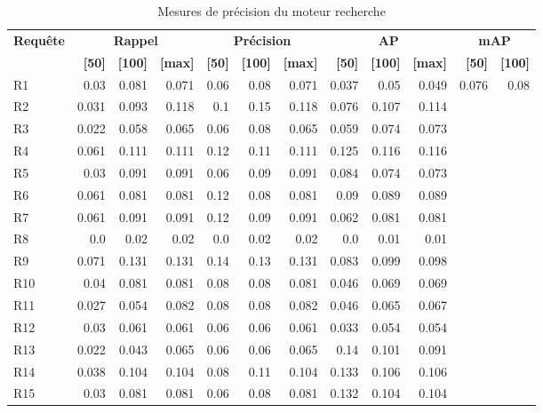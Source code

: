 \begin{table}[H]
\centering
\begin{tabular}{l|rrr|rrr|rrr|rr}
\toprule
\textbf{Requête} & \multicolumn{3}{c}{\textbf{Rappel}} & \multicolumn{3}{c}{\textbf{Précision}} & \multicolumn{3}{c}{\textbf{AP}} & \multicolumn{2}{c}{\textbf{mAP}} \\
 & \textbf{[50]} & \textbf{[100]} & \textbf{[max]} & \textbf{[50]} & \textbf{[100]} & \textbf{[max]} & \textbf{[50]} & \textbf{[100]} & \textbf{[max]} & \textbf{[50]} & \textbf{[100]} \\
\midrule
R1 & 0.03 & 0.081 & 0.071 & 0.06 & 0.08 & 0.071 & 0.037 & 0.05 & 0.049 & \multirow{15}{*}{0.076} & \multirow{15}{*}{0.08} \\
R2 & 0.031 & 0.093 & 0.118 & 0.1 & 0.15 & 0.118 & 0.076 & 0.107 & 0.114 \\
R3 & 0.022 & 0.058 & 0.065 & 0.06 & 0.08 & 0.065 & 0.059 & 0.074 & 0.073 \\
R4 & 0.061 & 0.111 & 0.111 & 0.12 & 0.11 & 0.111 & 0.125 & 0.116 & 0.116 \\
R5 & 0.03 & 0.091 & 0.091 & 0.06 & 0.09 & 0.091 & 0.084 & 0.074 & 0.073 \\
R6 & 0.061 & 0.081 & 0.081 & 0.12 & 0.08 & 0.081 & 0.09 & 0.089 & 0.089 \\
R7 & 0.061 & 0.091 & 0.091 & 0.12 & 0.09 & 0.091 & 0.062 & 0.081 & 0.081 \\
R8 & 0.0 & 0.02 & 0.02 & 0.0 & 0.02 & 0.02 & 0.0 & 0.01 & 0.01 \\
R9 & 0.071 & 0.131 & 0.131 & 0.14 & 0.13 & 0.131 & 0.083 & 0.099 & 0.098 \\
R10 & 0.04 & 0.081 & 0.081 & 0.08 & 0.08 & 0.081 & 0.046 & 0.069 & 0.069 \\
R11 & 0.027 & 0.054 & 0.082 & 0.08 & 0.08 & 0.082 & 0.046 & 0.065 & 0.067 \\
R12 & 0.03 & 0.061 & 0.061 & 0.06 & 0.06 & 0.061 & 0.033 & 0.054 & 0.054 \\
R13 & 0.022 & 0.043 & 0.065 & 0.06 & 0.06 & 0.065 & 0.14 & 0.101 & 0.091 \\
R14 & 0.038 & 0.104 & 0.104 & 0.08 & 0.11 & 0.104 & 0.133 & 0.106 & 0.106 \\
R15 & 0.03 & 0.081 & 0.081 & 0.06 & 0.08 & 0.081 & 0.132 & 0.104 & 0.104 \\
\bottomrule
\end{tabular}
\caption{Mesures de précision du moteur recherche}
\label{tab:results}
\end{table}
